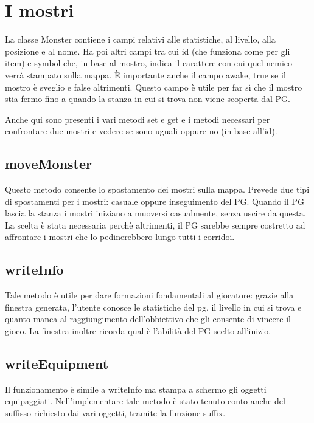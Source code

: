 \documentclass[12pt]{report}
\begin{document}
\section{I mostri}

La classe Monster contiene i campi relativi alle statistiche, al livello, alla posizione e al nome.
Ha poi altri campi tra cui id (che funziona come per gli item) e symbol che, in base al mostro, indica
il carattere con cui quel nemico verrà stampato sulla mappa.
È importante anche il campo awake, true se il mostro è sveglio e false altrimenti. Questo campo è utile
per far sì che il mostro stia fermo fino a quando la stanza in cui si trova non viene scoperta dal PG.

Anche qui sono presenti i vari metodi set e get e i metodi necessari per confrontare due mostri e vedere
se sono uguali oppure no (in base all'id).

\subsection{moveMonster}
Questo metodo consente lo spostamento dei mostri sulla mappa. Prevede due tipi di spostamenti per i
mostri: casuale oppure inseguimento del PG. Quando il PG lascia la stanza i mostri iniziano a muoversi
casualmente, senza uscire da questa. La scelta è stata necessaria perchè altrimenti, il PG sarebbe
sempre costretto ad affrontare i mostri che lo pedinerebbero lungo tutti i corridoi.	

\subsection{writeInfo}

Tale metodo è utile per dare formazioni fondamentali al giocatore: grazie alla finestra generata,
l'utente conosce le statistiche del pg, il livello in cui si trova e quanto manca al raggiungimento
dell'obbiettivo che gli consente di vincere il gioco. La finestra inoltre ricorda qual è l'abilità del
PG scelto all'inizio.

\subsection{writeEquipment}

Il funzionamento è simile a writeInfo ma stampa a schermo gli oggetti equipaggiati. Nell'implementare
tale metodo è stato tenuto conto anche del suffisso richiesto dai vari oggetti, tramite la funzione 
suffix.
\end{document}
